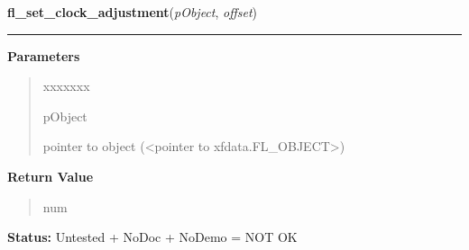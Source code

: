     \vspace{0.5ex}

\hspace{.8\funcindent}\begin{boxedminipage}{\funcwidth}

    \raggedright \textbf{fl\_set\_clock\_adjustment}(\textit{pObject}, \textit{offset})

    \vspace{-1.5ex}

    \rule{\textwidth}{0.5\fboxrule}
\setlength{\parskip}{2ex}
\setlength{\parskip}{1ex}
      \textbf{Parameters}
      \vspace{-1ex}

      \begin{quote}
        \begin{Ventry}{xxxxxxx}

          \item[pObject]

          pointer to object ({\textless}pointer to 
          xfdata.FL\_OBJECT{\textgreater})

        \end{Ventry}

      \end{quote}

      \textbf{Return Value}
    \vspace{-1ex}

      \begin{quote}
      num

      \end{quote}

\textbf{Status:} Untested + NoDoc + NoDemo = NOT OK



    \end{boxedminipage}

    \label{xformslib:library:fl_set_clock_ampm}

    \vspace{0.5ex}

